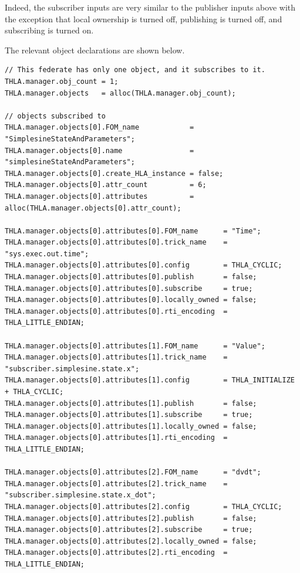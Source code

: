 Indeed, the subscriber inputs are very similar to the publisher inputs above
with the exception that
local ownership is turned off,
publishing is turned off, and
subscribing is turned on.

The relevant object declarations are shown below.

\begin{lstlisting}[caption={{\tt SIM\_simplesine\_hla\_sub} input file},label={list:hla-sub-input}]
// This federate has only one object, and it subscribes to it.
THLA.manager.obj_count = 1;
THLA.manager.objects   = alloc(THLA.manager.obj_count);

// objects subscribed to
THLA.manager.objects[0].FOM_name            = "SimplesineStateAndParameters";
THLA.manager.objects[0].name                = "simplesineStateAndParameters";
THLA.manager.objects[0].create_HLA_instance = false;
THLA.manager.objects[0].attr_count          = 6;
THLA.manager.objects[0].attributes          = alloc(THLA.manager.objects[0].attr_count);

THLA.manager.objects[0].attributes[0].FOM_name      = "Time";
THLA.manager.objects[0].attributes[0].trick_name    = "sys.exec.out.time";
THLA.manager.objects[0].attributes[0].config        = THLA_CYCLIC;
THLA.manager.objects[0].attributes[0].publish       = false;
THLA.manager.objects[0].attributes[0].subscribe     = true;
THLA.manager.objects[0].attributes[0].locally_owned = false;
THLA.manager.objects[0].attributes[0].rti_encoding  = THLA_LITTLE_ENDIAN;

THLA.manager.objects[0].attributes[1].FOM_name      = "Value";
THLA.manager.objects[0].attributes[1].trick_name    = "subscriber.simplesine.state.x";
THLA.manager.objects[0].attributes[1].config        = THLA_INITIALIZE + THLA_CYCLIC;
THLA.manager.objects[0].attributes[1].publish       = false;
THLA.manager.objects[0].attributes[1].subscribe     = true;
THLA.manager.objects[0].attributes[1].locally_owned = false;
THLA.manager.objects[0].attributes[1].rti_encoding  = THLA_LITTLE_ENDIAN;

THLA.manager.objects[0].attributes[2].FOM_name      = "dvdt";
THLA.manager.objects[0].attributes[2].trick_name    = "subscriber.simplesine.state.x_dot";
THLA.manager.objects[0].attributes[2].config        = THLA_CYCLIC;
THLA.manager.objects[0].attributes[2].publish       = false;
THLA.manager.objects[0].attributes[2].subscribe     = true;
THLA.manager.objects[0].attributes[2].locally_owned = false;
THLA.manager.objects[0].attributes[2].rti_encoding  = THLA_LITTLE_ENDIAN;


\end{lstlisting}

